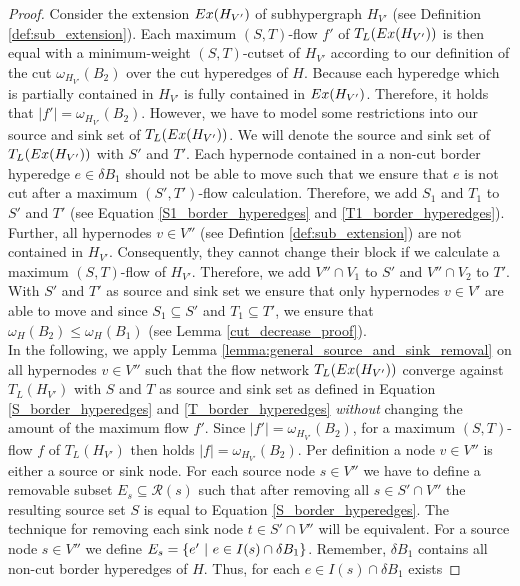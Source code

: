 \begin{proof}
Consider the extension $Ex(H_{V'})$ of subhypergraph $H_{V'}$ (see Definition \ref{def:sub_extension}).
Each maximum $(S,T)$-flow $f'$ of $T_L(Ex(H_{V'}))$ is then equal with a minimum-weight
$(S,T)$-cutset of $H_{V'}$ according to our definition of the cut $\omega_{H_{V'}}(B_2)$ over
the cut hyperedges of $H$. Because each hyperedge which is partially contained in $H_{V'}$
is fully contained in $Ex(H_{V'})$. Therefore, it holds that $|f'| = \omega_{H_{V'}}(B_2)$.
However, we have to model some restrictions into our source and sink set of $T_L(Ex(H_{V'}))$.
We will denote the source and sink set of $T_L(Ex(H_{V'}))$ with $S'$ and $T'$.
Each hypernode contained in a non-cut border hyperedge $e \in \delta B_1$ should not be able to move
such that we ensure that $e$ is not cut after a maximum $(S',T')$-flow calculation. Therefore,
we add $S_1$ and $T_1$ to $S'$ and $T'$ (see Equation \ref{S1_border_hyperedges} and \ref{T1_border_hyperedges}).
Further, all hypernodes $v \in V''$ (see Defintion \ref{def:sub_extension}) are not contained in
$H_{V'}$. Consequently, they cannot change their block if we calculate a maximum $(S,T)$-flow of
$H_{V'}$. Therefore, we add $V'' \cap V_1$ to $S'$ and $V'' \cap V_2$ to $T'$.
With $S'$ and $T'$ as source and sink set we ensure that only hypernodes $v \in V'$ are able
to move and since $S_1 \subseteq S'$ and $T_1 \subseteq T'$, we ensure that $\omega_H(B_2) \le \omega_H(B_1)$
(see Lemma \ref{cut_decrease_proof}). \\
In the following, we apply Lemma \ref{lemma:general_source_and_sink_removal} on all
hypernodes $v \in V''$ such that the flow network $T_L(Ex(H_{V'}))$ converge against
$T_L(H_{V'})$ with $S$ and $T$ as source and sink set as defined in Equation 
\ref{S_border_hyperedges} and \ref{T_border_hyperedges} \emph{without} changing the
amount of the maximum flow $f'$. Since $|f'| = \omega_{H_{V'}}(B_2)$, for a maximum $(S,T)$-flow
$f$ of $T_L(H_{V'})$ then holds $|f| = \omega_{H_{V'}}(B_2)$. Per definition a node $v \in V''$
is either a source or sink node. For each source node $s \in V''$ we have to 
define a removable subset $E_s \subseteq \mathcal{R}(s)$ such that after removing all $s \in S' \cap V''$
the resulting source set $S$ is equal to Equation \ref{S_border_hyperedges}. The technique
for removing each sink node $t \in S' \cap V''$ will be equivalent. For a source node $s \in V''$
we define $E_s = \{e'\ |\ e \in I(s) \cap \delta B_1\}$. Remember, $\delta B_1$ contains
all non-cut border hyperedges of $H$. Thus, for each $e \in I(s) \cap \delta B_1$ exists

\end{proof}
